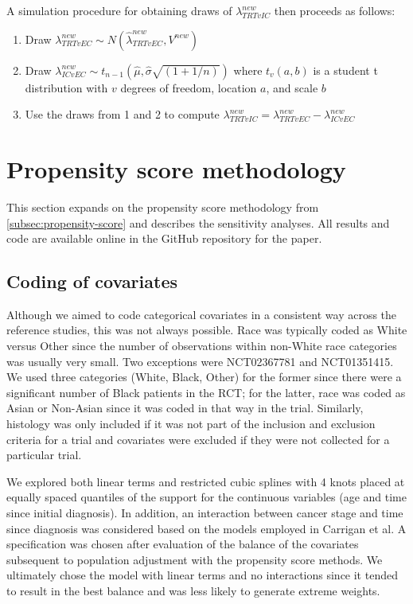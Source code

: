 \documentclass[11pt,final,fleqn]{article}\usepackage[]{graphicx}\usepackage[]{color}
\begin{document}
A simulation procedure for obtaining draws of $\lambda_{\textit{TRT}vIC}^{new}$ then proceeds as follows:

\begin{enumerate}
\item Draw $\lambda_{\textit{TRT}vEC}^{new} \sim N(\hat{\lambda}_{\textit{TRT}vEC}^{new}, V^{new})$ 

\item Draw $\lambda_{ICvEC}^{new} \sim t_{n-1}(\hat{\mu}, \hat{\sigma}\sqrt{(1 + 1/n)})$ where $t_v(a, b)$ is a student t distribution with $v$ degrees of freedom, location $a$, and scale $b$

\item Use the draws from 1 and 2 to compute $\lambda_{\textit{TRT}vIC}^{new} =  \lambda_{\textit{TRT}vEC}^{new} - \lambda_{ICvEC}^{new}$
\end{enumerate}

\section{Propensity score methodology} \label{appendix:ps}
This section expands on the propensity score methodology from \autoref{subsec:propensity-score} and describes the sensitivity analyses. All results and code are available online in the GitHub repository for the paper.

\subsection{Coding of covariates}
Although we aimed to code categorical covariates in a consistent way across the reference studies, this was not always possible. Race was typically coded as White versus Other since the number of observations within non-White race categories was usually very small. Two exceptions were NCT02367781 and NCT01351415. We used three categories (White, Black, Other) for the former since there were a significant number of Black patients in the RCT; for the latter, race was coded as Asian or Non-Asian since it was coded in that way in the trial. Similarly, histology was only included if it was not part of the inclusion and exclusion criteria for a trial and covariates were excluded if they were not collected for a particular trial.

We explored both linear terms and restricted cubic splines with 4 knots placed at equally spaced quantiles of the support for the continuous variables (age and time since initial diagnosis). In addition, an interaction between cancer stage and time since diagnosis was considered based on the models employed in Carrigan et al.\cite{carrigan2020using} A specification was chosen after evaluation of the balance of the covariates subsequent to population adjustment with the propensity score methods. We ultimately chose the model with linear terms and no interactions since it tended to  result in the best balance and was less likely to generate extreme weights. 
\end{document}
